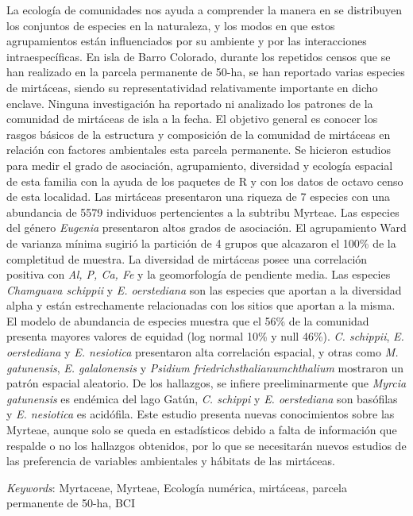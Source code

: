 \documentclass[11pt,]{article}
\renewenvironment{abstract}
 {{%
    \setlength{\leftmargin}{0mm}
    \setlength{\rightmargin}{\leftmargin}%
  }%
  \relax}
 {\endlist}
\begin{document}
\begin{abstract}

    \hbox{\vrule height .2pt width 39.14pc}

    \vskip 8.5pt %

\noindent La ecología de comunidades nos ayuda a comprender la manera en se
distribuyen los conjuntos de especies en la naturaleza, y los modos en
que estos agrupamientos están influenciados por su ambiente y por las
interacciones intraespecíficas. En isla de Barro Colorado, durante los
repetidos censos que se han realizado en la parcela permanente de 50-ha,
se han reportado varias especies de mirtáceas, siendo su
representatividad relativamente importante en dicho enclave. Ninguna
investigación ha reportado ni analizado los patrones de la comunidad de
mirtáceas de isla a la fecha. El objetivo general es conocer los rasgos
básicos de la estructura y composición de la comunidad de mirtáceas en
relación con factores ambientales esta parcela permanente. Se hicieron
estudios para medir el grado de asociación, agrupamiento, diversidad y
ecología espacial de esta familia con la ayuda de los paquetes de R y
con los datos de octavo censo de esta localidad. Las mirtáceas
presentaron una riqueza de 7 especies con una abundancia de 5579
individuos pertencientes a la subtribu Myrteae. Las especies del género
\emph{Eugenia} presentaron altos grados de asociación. El agrupamiento
Ward de varianza mínima sugirió la partición de 4 grupos que alcazaron
el 100\% de la completitud de muestra. La diversidad de mirtáceas posee
una correlación positiva con \emph{Al, P, Ca, Fe} y la geomorfología de
pendiente media. Las especies \emph{Chamguava schippii} y \emph{E.
oerstediana} son las especies que aportan a la diversidad alpha y están
estrechamente relacionadas con los sitios que aportan a la misma. El
modelo de abundancia de especies muestra que el 56\% de la comunidad
presenta mayores valores de equidad (log normal 10\% y null 46\%).
\emph{C. schippii}, \emph{E. oerstediana} y \emph{E. nesiotica}
presentaron alta correlación espacial, y otras como \emph{M.
gatunensis}, \emph{E. galalonensis} y \emph{Psidium
friedrichsthalianumchthalium} mostraron un patrón espacial aleatorio. De
los hallazgos, se infiere preeliminarmente que \emph{Myrcia gatunensis}
es endémica del lago Gatún, \emph{C. schippi} y \emph{E. oerstediana}
son basófilas y \emph{E. nesiotica} es acidófila. Este estudio presenta
nuevas conocimientos sobre las Myrteae, aunque solo se queda en
estadísticos debido a falta de información que respalde o no los
hallazgos obtenidos, por lo que se necesitarán nuevos estudios de las
preferencia de variables ambientales y hábitats de las mirtáceas.


\vskip 8.5pt \noindent \emph{Keywords}: Myrtaceae, Myrteae, Ecología numérica, mirtáceas, parcela permanente de
50-ha, BCI \par

    \hbox{\vrule height .2pt width 39.14pc}



\end{abstract}
\end{document}
